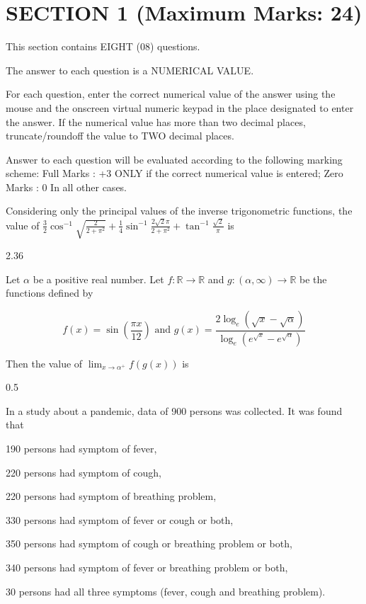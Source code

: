 \section{SECTION 1 (Maximum Marks: 24)}
This section contains EIGHT (08) questions.

The answer to each question is a NUMERICAL VALUE.

For each question, enter the correct numerical value of the answer using the mouse and the onscreen virtual numeric keypad in the place designated to enter the answer. If the numerical value has more than two decimal places, truncate/roundoff the value to TWO decimal places.

Answer to each question will be evaluated according to the following marking scheme:
Full Marks : +3 ONLY if the correct numerical value is entered;
Zero Marks : 0 In all other cases.

Considering only the principal values of the inverse trigonometric functions, the value of $\frac{3}{2} \cos ^{-1} \sqrt{\frac{2}{2+\pi^{2}}}+\frac{1}{4} \sin ^{-1} \frac{2 \sqrt{2} \pi}{2+\pi^{2}}+\tan ^{-1} \frac{\sqrt{2}}{\pi}$ is

2.36

Let $\alpha$ be a positive real number. Let $f: \mathbb{R} \rightarrow \mathbb{R}$ and $g:(\alpha, \infty) \rightarrow \mathbb{R}$ be the functions defined by

$$
f(x)=\sin \left(\frac{\pi x}{12}\right) \text { and } g(x)=\frac{2 \log _{e}(\sqrt{x}-\sqrt{\alpha})}{\log _{e}\left(e^{\sqrt{x}}-e^{\sqrt{\alpha}}\right)}
$$

Then the value of $\lim _{x \rightarrow \alpha^{+}} f(g(x))$ is

0.5

In a study about a pandemic, data of 900 persons was collected. It was found that

190 persons had symptom of fever,

220 persons had symptom of cough,

220 persons had symptom of breathing problem,

330 persons had symptom of fever or cough or both,

350 persons had symptom of cough or breathing problem or both,

340 persons had symptom of fever or breathing problem or both,

30 persons had all three symptoms (fever, cough and breathing problem).

